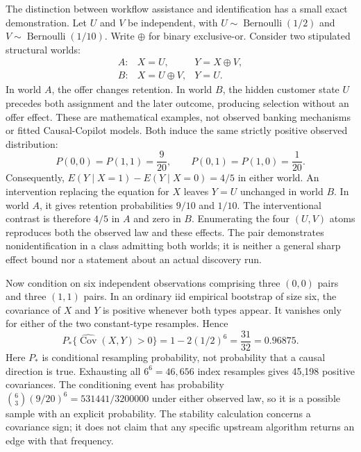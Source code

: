 The distinction between workflow assistance and identification has a small
exact demonstration. Let $U$ and $V$ be independent, with
$U\sim\operatorname{Bernoulli}(1/2)$ and
$V\sim\operatorname{Bernoulli}(1/10)$. Write $\oplus$ for binary exclusive-or.
Consider two stipulated structural worlds:
\begin{equation}
 \begin{array}{lll}
 A:& X=U,&Y=X\oplus V,\\
 B:& X=U\oplus V,&Y=U.
 \end{array}
 \label{exec17:copilot-worlds}
\end{equation}
In world $A$, the offer changes retention. In world $B$, the hidden customer
state $U$ precedes both assignment and the later outcome, producing selection
without an offer effect. These are mathematical examples, not observed banking
mechanisms or fitted Causal-Copilot models. Both induce the same strictly
positive observed distribution:
\begin{equation}
 P(0,0)=P(1,1)=\frac9{20},\qquad
 P(0,1)=P(1,0)=\frac1{20}.
 \label{exec17:copilot-observed}
\end{equation}
Consequently, $E(Y\mid X=1)-E(Y\mid X=0)=4/5$ in either world.
An intervention replacing the equation for $X$ leaves $Y=U$ unchanged in
world $B$. In world $A$, it gives retention probabilities $9/10$ and $1/10$.
The interventional contrast is therefore $4/5$ in $A$ and zero in $B$.
Enumerating the four $(U,V)$ atoms reproduces both the observed law and these
effects. The pair demonstrates nonidentification in a class admitting both
worlds; it is neither a general sharp effect bound nor a statement about an
actual discovery run.~\citep{exec17_copilot_exact}

Now condition on six independent observations comprising three $(0,0)$ pairs
and three $(1,1)$ pairs. In an ordinary iid empirical bootstrap of size six,
the covariance of $X$ and $Y$ is positive whenever both types appear.
It vanishes only for either of the two constant-type resamples. Hence
\begin{equation}
 P_*\{\widehat{\operatorname{Cov}}(X,Y)>0\}
 =1-2(1/2)^6=\frac{31}{32}=0.96875.
 \label{exec17:copilot-stability}
\end{equation}
Here $P_*$ is conditional resampling probability, not probability that a causal
direction is true. Exhausting all $6^6=46{,}656$ index resamples gives 45,198
positive covariances. The conditioning event has probability
$\binom63(9/20)^6=531441/3200000$ under either observed law, so it is a possible
sample with an explicit probability. The stability calculation concerns a
covariance sign; it does not claim that any specific upstream algorithm returns
an edge with that frequency.~\citep{exec17_copilot_exact}

